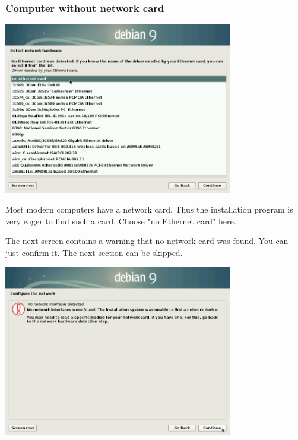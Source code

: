 \documentclass[a4paper,12pt,twoside]{article}
\begin{document}
\subsubsection{Computer without network card}
\label{sct:inst_no_net}

\begin{minipage}{\linewidth}
  \centering
  \captionsetup{type=figure}
  \includegraphics[width=10cm]{screenshots/select_network_card.png}
  \label{fig:inst_netzwerkkarte}
\end{minipage}
\bigskip

Most modern computers have a network card. Thus the installation program
is very eager to find such a card. Choose "no Ethernet card" here.

The next screen contains a warning that no network card was found. You can
just confirm it. The next section can be skipped.

\bigskip
\begin{minipage}{\linewidth}
  \centering
  \captionsetup{type=figure}
  \includegraphics[width=10cm]{screenshots/message_no_network.png}
  \label{fig:inst_conf_net}
\end{minipage}
\end{document}
